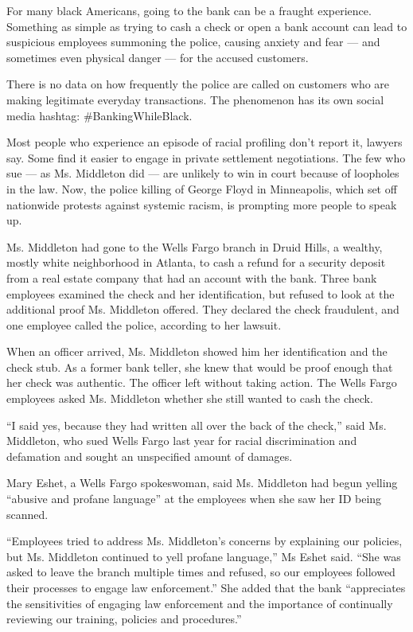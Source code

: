 For many black Americans, going to the bank can be a fraught experience.
Something as simple as trying to cash a check or open a bank account can
lead to suspicious employees summoning the police, causing anxiety and
fear --- and sometimes even physical danger --- for the accused
customers.

There is no data on how frequently the police are called on customers
who are making legitimate everyday transactions. The phenomenon has its
own social media hashtag: \#BankingWhileBlack.

Most people who experience an episode of racial profiling don't report
it, lawyers say. Some find it easier to engage in private settlement
negotiations. The few who sue --- as Ms. Middleton did --- are unlikely
to win in court because of loopholes in the law. Now, the police killing
of George Floyd in Minneapolis, which set off nationwide protests
against systemic racism, is prompting more people to speak up.

Ms. Middleton had gone to the Wells Fargo branch in Druid Hills, a
wealthy, mostly white neighborhood in Atlanta, to cash a refund for a
security deposit from a real estate company that had an account with the
bank. Three bank employees examined the check and her identification,
but refused to look at the additional proof Ms. Middleton offered. They
declared the check fraudulent, and one employee called the police,
according to her lawsuit.

When an officer arrived, Ms. Middleton showed him her identification and
the check stub. As a former bank teller, she knew that would be proof
enough that her check was authentic. The officer left without taking
action. The Wells Fargo employees asked Ms. Middleton whether she still
wanted to cash the check.

``I said yes, because they had written all over the back of the check,''
said Ms. Middleton, who sued Wells Fargo last year for racial
discrimination and defamation and sought an unspecified amount of
damages.

Mary Eshet, a Wells Fargo spokeswoman, said Ms. Middleton had begun
yelling ``abusive and profane language'' at the employees when she saw
her ID being scanned.

``Employees tried to address Ms. Middleton's concerns by explaining our
policies, but Ms. Middleton continued to yell profane language,'' Ms
Eshet said. ``She was asked to leave the branch multiple times and
refused, so our employees followed their processes to engage law
enforcement.'' She added that the bank ``appreciates the sensitivities
of engaging law enforcement and the importance of continually reviewing
our training, policies and procedures.''

